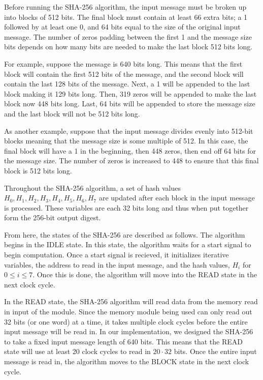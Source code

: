 \documentclass{article}
\begin{document}

Before running the SHA-256 algorithm, the input message must be broken up into blocks of 512 bits. The final block must contain at least 66 extra bits; a 1 followed by at least one 0, and 64 bits equal to the size of the original input message. The number of zeros padding between the first 1 and the message size bits depends on how many bits are needed to make the last block 512 bits long.

For example, suppose the message is 640 bits long. This means that the first block will contain the first 512 bits of the message, and the second block will contain the last 128 bits of the message. Next, a 1 will be appended to the last block making it 129 bits long. Then, 319 zeros will be appended to make the last block now 448 bits long. Last, 64 bits will be appended to store the message size and the last block will not be 512 bits long.

As another example, suppose that the input message divides evenly into 512-bit blocks meaning that the message size is some multiple of 512. In this case, the final block will have a 1 in the beginning, then 448 zeros, then end off 64 bits for the message size. The number of zeros is increased to 448 to ensure that this final block is 512 bits long.

Throughout the SHA-256 algorithm, a set of hash values $H_0, H_1, H_2, H_3, H_4, H_5, H_6, H_7$ are updated after each block in the input message is processed. These variables are each 32 bits long and thus when put together form the 256-bit output digest.

From here, the states of the SHA-256 are described as follows. The algorithm begins in the IDLE state. In this state, the algorithm waits for a start signal to begin computation. Once a start signal is recieved, it initializes iterative variables, the address to read in the input message, and the hash values, $H_i$ for $0 \leq i \leq 7$. Once this is done, the algorithm will move into the READ state in the next clock cycle.

In the READ state, the SHA-256 algorithm will read data from the memory read in input of the module. Since the memory module being used can only read out 32 bits (or one word) at a time, it takes multiple clock cycles before the entire input message will be read in. In our implementation, we designed the SHA-256 to take a fixed input message length of 640 bits. This means that the READ state will use at least 20 clock cycles to read in $20\cdot 32$ bits. Once the entire input message is read in, the algorithm moves to the BLOCK state in the next clock cycle.
\end{document}
